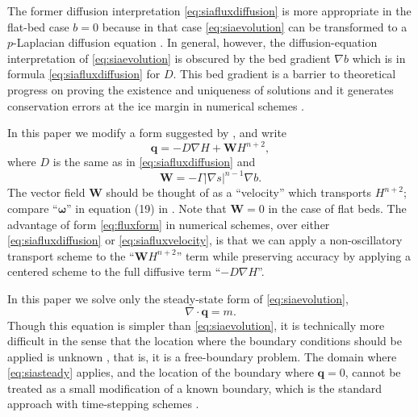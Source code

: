 \documentclass[twocolumn]{igs}
\newcommand\bq{\mathbf{q}}
\newcommand\bW{\mathbf{W}}
\newcommand{\Div}{\nabla\cdot}
\newcommand{\grad}{\nabla}
\begin{document}
The former diffusion interpretation \eqref{eq:siafluxdiffusion} is more appropriate in the flat-bed case $b=0$ because in that case \eqref{eq:siaevolution} can be transformed to a $p$-Laplacian diffusion equation \citep{CDDSV}.  In general, however, the diffusion-equation interpretation of \eqref{eq:siaevolution} is obscured by the bed gradient $\grad b$ which is in formula \eqref{eq:siafluxdiffusion} for $D$.  This bed gradient is a barrier to theoretical progress on proving the existence and uniqueness of solutions \citep{JouvetBueler2012} and it generates conservation errors at the ice margin in numerical schemes \citep{JaroschSchoofAnslow2013}.

In this paper we modify a form suggested by \cite{JaroschSchoofAnslow2013}, and write
\begin{equation}
\bq = - D \grad H + \bW H^{n+2},\label{eq:fluxform}
\end{equation}
where $D$ is the same as in \eqref{eq:siafluxdiffusion} and
\begin{equation}
\bW = - \Gamma |\grad s|^{n-1} \grad b.  \label{eq:siaWdefine}
\end{equation}
The vector field $\bW$ should be thought of as a ``velocity'' which transports $H^{n+2}$; compare ``$\boldsymbol{\omega}$'' in equation (19) in \citep{JaroschSchoofAnslow2013}.  Note that $\bW=0$ in the case of flat beds.  The advantage of form \eqref{eq:fluxform} in numerical schemes, over either \eqref{eq:siafluxdiffusion} or \eqref{eq:siafluxvelocity}, is that we can apply a non-oscillatory transport scheme to the ``$\bW H^{n+2}$'' term while preserving accuracy by applying a centered scheme to the full diffusive term ``$-D \grad H$''.

In this paper we solve only the steady-state form of \eqref{eq:siaevolution},
\begin{equation}
\Div \bq = m.  \label{eq:siasteady}
\end{equation}
Though this equation is simpler than \eqref{eq:siaevolution}, it is technically more difficult in the sense that the location where the boundary conditions should be applied is unknown \citep{JaroschSchoofAnslow2013,JouvetBueler2012}, that is, it is a free-boundary problem.  The domain where \eqref{eq:siasteady} applies, and the location of the boundary where $\bq=0$, cannot be treated as a small modification of a known boundary, which is the standard approach with time-stepping schemes \citep{Bueleretal2005,Huybrechtsetal1996}.
\end{document}
